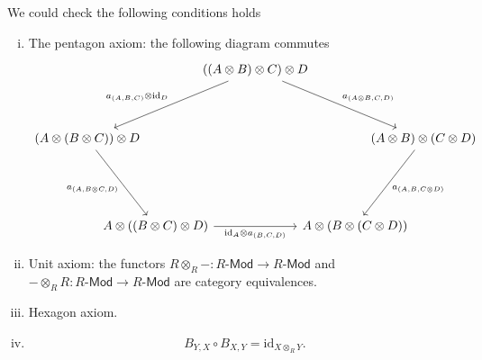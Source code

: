 \begin{prf}
    We could check the following conditions holds
    \begin{enumerate}[(i)]
        \item The pentagon axiom: the following diagram commutes
    \[
        \begin{tikzcd}[ampersand replacement=\&, column sep=small]
            \& [-50pt]                  \&[-25pt]    ((A\otimes B)\otimes C)\otimes D \arrow[lld, "{a_{(A,B,C)}\otimes \mathrm{id}_D}"'] \arrow[rrd, "{a_{(A\otimes B,C,D)}}"] \& [-25pt]                  \&   [-50pt]                                                                      \\[+20pt]
(A\otimes( B\otimes C))\otimes D \arrow[rd, "{a_{(A,B\otimes C,D)}}"'] \&                                                                                    \&    \&       \& (A\otimes B)\otimes (C\otimes D) \arrow[ld, "{a_{(A, B, C\otimes D)}}"] \\[+35pt]
            \& A\otimes( (B\otimes C)\otimes D) \arrow[rr, "{\mathrm{id}_A\otimes a_{(B,C,D)}}"'] \&    \& A\otimes( B\otimes (C\otimes D)) \&                                                                        
\end{tikzcd}
    \]
    \item Unit axiom: the functors $R\otimes_R -:R\text{-}\mathsf{Mod}\to R\text{-}\mathsf{Mod}$ and $-\otimes_R R:R\text{-}\mathsf{Mod} \to R\text{-}\mathsf{Mod} $ are category equivalences.
    \item Hexagon axiom.
    \item  \[
        B_{Y,X}\circ B_{X,Y}=\mathrm{id}_{X\otimes_R Y}.
    \]
    \end{enumerate}
\end{prf}

